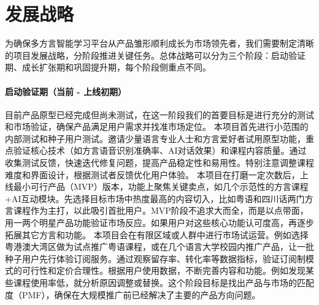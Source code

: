 \section{发展战略}
为确保多方言智能学习平台从产品雏形顺利成长为市场领先者，我们需要制定清晰的项目发展战略，分阶段推进关键任务。总体战略可以分为三个阶段：启动验证期、成长扩张期和巩固提升期，每个阶段侧重点不同。

\paragraph{启动验证期（当前 - 上线初期）}目前产品原型已经完成但尚未测试，在这一阶段我们的首要目标是进行充分的测试和市场验证，确保产品满足用户需求并找准市场定位。
	本项目首先进行小范围的内部测试和种子用户测试。邀请少量语言专业人士和方言爱好者试用原型功能，重点验证核心技术（如方言语音识别准确率、AI对话效果）和课程内容质量。通过收集测试反馈，快速迭代修复问题，提高产品稳定性和易用性。特别注意调整课程难度和界面设计，根据测试者反馈优化用户体验。
	本项目在打磨一定次数后，上线最小可行产品（MVP）版本，功能上聚焦关键卖点，如几个示范性的方言课程+AI互动模块。先选择目标市场中热度最高的内容切入，比如粤语和四川话两门方言课程作为主打，以此吸引首批用户。MVP阶段不追求大而全，而是以点带面，用一两个明星产品功能验证市场反应。如果用户对这些核心功能认可度高，再逐步拓展其它方言和功能。
	本项目会在有限区域或人群中进行市场试运营。例如选择粤港澳大湾区做为试点推广粤语课程，或在几个语言大学校园内推广产品，让一批种子用户先行体验订阅服务。通过观察留存率、转化率等数据指标，验证订阅制模式的可行性和定价合理性。根据用户使用数据，不断完善内容和功能。例如发现某些课程使用率低，就分析原因调整或替换。这个阶段目标是找出产品与市场的匹配度（PMF），确保在大规模推广前已经解决了主要的产品方向问题。

